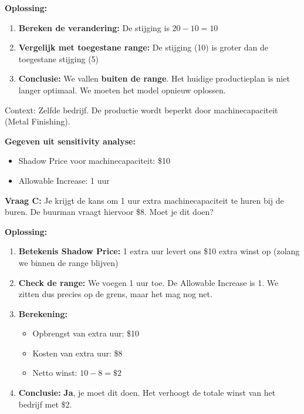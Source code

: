 \documentclass[a4paper,11pt]{article}
\begin{document}
\begin{oefenblok}
    \textbf{Oplossing:}
    \begin{enumerate}
        \item \textbf{Bereken de verandering:} De stijging is $20 - 10 = 10$
        \item \textbf{Vergelijk met toegestane range:}
              De stijging (10) is groter dan de toegestane stijging (5)
        \item \textbf{Conclusie:} We vallen \textbf{buiten de range}. Het huidige productieplan is niet langer optimaal.
              We moeten het model opnieuw oplossen.
    \end{enumerate}
\end{oefenblok}

\begin{oefenblok}
    Context: Zelfde bedrijf. De productie wordt beperkt door machinecapaciteit (Metal Finishing).

    \textbf{Gegeven uit sensitivity analyse:}
    \begin{itemize}
        \item Shadow Price voor machinecapaciteit: \$10
        \item Allowable Increase: 1 uur
    \end{itemize}

    \textbf{Vraag C:} Je krijgt de kans om 1 uur extra machinecapaciteit te huren bij de buren.
    De buurman vraagt hiervoor \$8. Moet je dit doen?

    \textbf{Oplossing:}
    \begin{enumerate}
        \item \textbf{Betekenis Shadow Price:} 1 extra uur levert ons \$10 extra winst op (zolang we binnen de range blijven)
        \item \textbf{Check de range:} We voegen 1 uur toe. De Allowable Increase is 1.
              We zitten dus precies op de grens, maar het mag nog net.
        \item \textbf{Berekening:}
              \begin{itemize}
                  \item Opbrengst van extra uur: \$10
                  \item Kosten van extra uur: \$8
                  \item Netto winst: $10 - 8 = \$2$
              \end{itemize}
        \item \textbf{Conclusie:} \textbf{Ja}, je moet dit doen. Het verhoogt de totale winst van het bedrijf met \$2.
    \end{enumerate}


\end{oefenblok}
\end{document}
